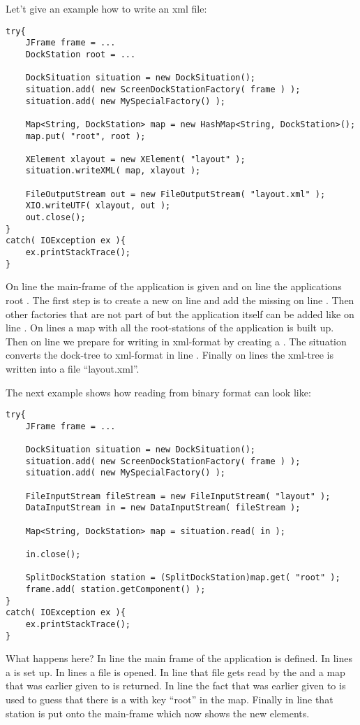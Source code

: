 Let't give an example how to write an xml file:
\begin{lstlisting}
try{
	JFrame frame = ...
	DockStation root = ...

	DockSituation situation = new DockSituation();
	situation.add( new ScreenDockStationFactory( frame ) );
	situation.add( new MySpecialFactory() );

	Map<String, DockStation> map = new HashMap<String, DockStation>();
	map.put( "root", root );

	XElement xlayout = new XElement( "layout" );
	situation.writeXML( map, xlayout );

	FileOutputStream out = new FileOutputStream( "layout.xml" );
	XIO.writeUTF( xlayout, out );
	out.close();
}
catch( IOException ex ){
	ex.printStackTrace();
}
\end{lstlisting}
On line  the main-frame of the application is given and on line  the applications root . The first step is to create a new  on line  and add the missing  on line . Then other factories that are not part of  but the application itself can be added like on line . On lines  a map with all the root-stations of the application is built up. Then on line  we prepare for writing in xml-format by creating a . The situation converts the dock-tree to xml-format in line . Finally on lines  the xml-tree is written into a file ``layout.xml''.

The next example shows how reading from binary format can look like:
\begin{lstlisting}
try{
	JFrame frame = ...

	DockSituation situation = new DockSituation();
	situation.add( new ScreenDockStationFactory( frame ) );
	situation.add( new MySpecialFactory() );

	FileInputStream fileStream = new FileInputStream( "layout" );
	DataInputStream in = new DataInputStream( fileStream );

	Map<String, DockStation> map = situation.read( in );

	in.close();

	SplitDockStation station = (SplitDockStation)map.get( "root" );
	frame.add( station.getComponent() );
}
catch( IOException ex ){
	ex.printStackTrace();
}
\end{lstlisting}
What happens here? In line  the main frame of the application is defined. In lines  a  is set up. In lines  a file is opened. In line  that file gets read by the  and a map that was earlier given to  is returned. In line  the fact that  was earlier given to  is used to guess that there is a  with key ``root'' in the map. Finally in line  that station is put onto the main-frame which now shows the new elements.

